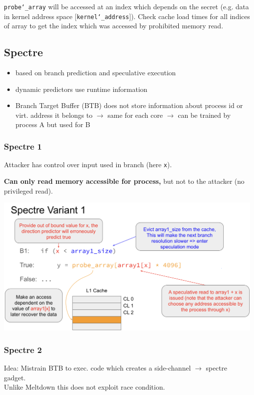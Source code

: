 \texttt{probe\char`_array} will be accessed at an index which depends on the
secret (e.g. data in kernel address space $[$\texttt{kernel\char`_address}$]$).
Check cache load times for all indices of array to get the index which was accessed by prohibited memory read.

\subsection{Spectre}
\begin{itemize}
    \item based on branch prediction and speculative execution
    \item dynamic predictors use runtime information
    \item Branch Target Buffer (BTB) does not store information about process id or virt. address it belongs to $\xrightarrow{}$ same for each core $\xrightarrow{}$ can be trained by process A but used for B
\end{itemize}

\subsubsection{Spectre 1}
Attacker has control over input used in branch (here \texttt{x}).

\textbf{Can only read memory accessible for process,} but not to the attacker (no privileged read).

\begin{center}
    \includegraphics[width=\linewidth]{images/spectre1-overview.png}
\end{center}

\subsubsection{Spectre 2}
Idea: Mistrain BTB to exec. code which creates a side-channel $\xrightarrow{}$
spectre gadget.\\
Unlike Meltdown this does not exploit race condition.

